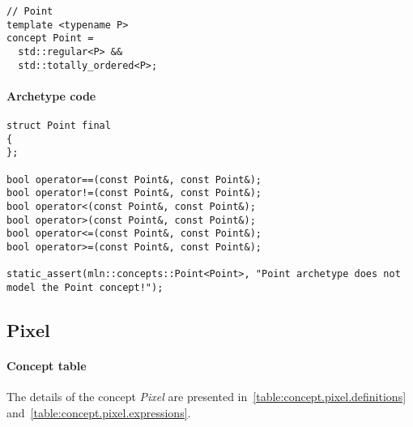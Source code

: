 \begin{verbatim}
// Point
template <typename P>
concept Point =
  std::regular<P> &&
  std::totally_ordered<P>;
\end{verbatim}

\paragraph{Archetype code}

\begin{verbatim}
struct Point final
{
};

bool operator==(const Point&, const Point&);
bool operator!=(const Point&, const Point&);
bool operator<(const Point&, const Point&);
bool operator>(const Point&, const Point&);
bool operator<=(const Point&, const Point&);
bool operator>=(const Point&, const Point&);

static_assert(mln::concepts::Point<Point>, "Point archetype does not model the Point concept!");
\end{verbatim}


\clearpage

\subsection{Pixel}

\paragraph{Concept table}

The details of the concept \emph{Pixel} are presented in~\cref{table:concept.pixel.definitions}
and~\cref{table:concept.pixel.expressions}.

